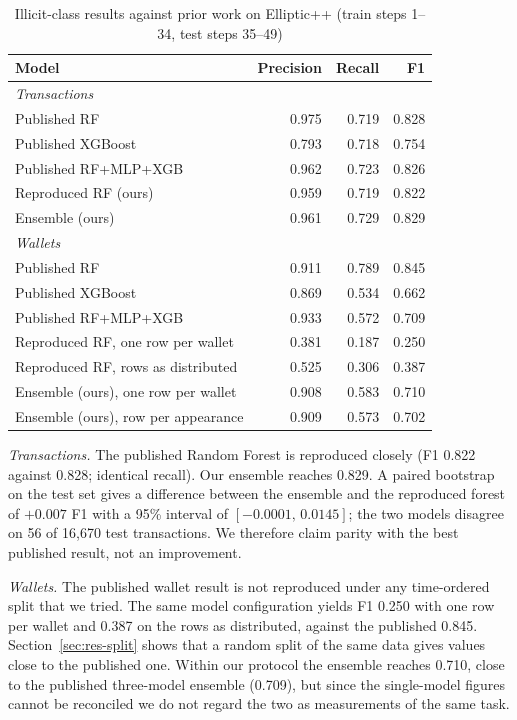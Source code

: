\begin{table}[t]
\caption{Illicit-class results against prior work on Elliptic++ (train steps 1--34, test steps 35--49)}\label{tab:published}
\centering
\setlength{\tabcolsep}{3pt}
\begin{tabular}{lrrr}
\toprule
Model & Precision & Recall & F1 \\
\midrule
\multicolumn{4}{l}{\emph{Transactions}} \\
Published RF~\cite{elmougy2023} & 0.975 & 0.719 & 0.828 \\
Published XGBoost~\cite{elmougy2023} & 0.793 & 0.718 & 0.754 \\
Published RF+MLP+XGB~\cite{elmougy2023} & 0.962 & 0.723 & 0.826 \\
Reproduced RF (ours) & 0.959 & 0.719 & 0.822 \\
Ensemble (ours) & 0.961 & 0.729 & 0.829 \\
\midrule
\multicolumn{4}{l}{\emph{Wallets}} \\
Published RF~\cite{elmougy2023} & 0.911 & 0.789 & 0.845 \\
Published XGBoost~\cite{elmougy2023} & 0.869 & 0.534 & 0.662 \\
Published RF+MLP+XGB~\cite{elmougy2023} & 0.933 & 0.572 & 0.709 \\
Reproduced RF, one row per wallet & 0.381 & 0.187 & 0.250 \\
Reproduced RF, rows as distributed & 0.525 & 0.306 & 0.387 \\
Ensemble (ours), one row per wallet & 0.908 & 0.583 & 0.710 \\
Ensemble (ours), row per appearance & 0.909 & 0.573 & 0.702 \\
\bottomrule
\end{tabular}
\end{table}

\emph{Transactions.} The published Random Forest is reproduced closely (F1 0.822 against 0.828; identical recall). Our ensemble reaches 0.829. A paired bootstrap on the test set gives a difference between the ensemble and the reproduced forest of $+0.007$ F1 with a 95\% interval of $[-0.0001,\, 0.0145]$; the two models disagree on 56 of 16,670 test transactions. We therefore claim parity with the best published result, not an improvement.

\emph{Wallets.} The published wallet result is not reproduced under any time-ordered split that we tried. The same model configuration yields F1 0.250 with one row per wallet and 0.387 on the rows as distributed, against the published 0.845. Section~\ref{sec:res-split} shows that a random split of the same data gives values close to the published one. Within our protocol the ensemble reaches 0.710, close to the published three-model ensemble (0.709), but since the single-model figures cannot be reconciled we do not regard the two as measurements of the same task.

